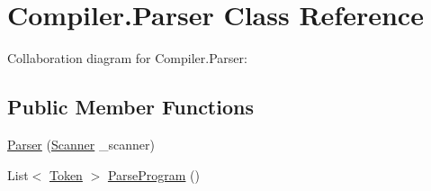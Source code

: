 \hypertarget{class_compiler_1_1_parser}{}\section{Compiler.\+Parser Class Reference}
\label{class_compiler_1_1_parser}


Collaboration diagram for Compiler.\+Parser\+:
\subsection*{Public Member Functions}
\begin{DoxyCompactItemize}
\item 
\mbox{\hyperlink{class_compiler_1_1_parser_a450e11452db3f91ff866fc1e36ebc79d}{Parser}} (\mbox{\hyperlink{class_compiler_1_1_scanner}{Scanner}} \+\_\+scanner)
\item 
List$<$ \mbox{\hyperlink{class_compiler_1_1_token}{Token}} $>$ \mbox{\hyperlink{class_compiler_1_1_parser_a79846432a61621214101d01681b994ac}{Parse\+Program}} ()
\end{DoxyCompactItemize}
